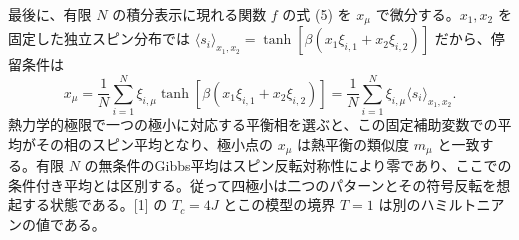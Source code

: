 \documentclass[11pt,a4paper]{article}
\begin{document}
最後に、有限 $N$ の積分表示に現れる関数 $f$ の式 (5) を $x_\mu$ で微分する。$x_1,x_2$ を固定した独立スピン分布では $\langle s_i\rangle_{x_1,x_2}=\tanh[\beta(x_1\xi_{i,1}+x_2\xi_{i,2})]$ だから、停留条件は
\begin{equation}
x_\mu=\frac1N\sum_{i=1}^N\xi_{i,\mu}
\tanh[\beta(x_1\xi_{i,1}+x_2\xi_{i,2})]
=\frac1N\sum_{i=1}^N\xi_{i,\mu}\langle s_i\rangle_{x_1,x_2}.
\end{equation}
熱力学的極限で一つの極小に対応する平衡相を選ぶと、この固定補助変数での平均がその相のスピン平均となり、極小点の $x_\mu$ は熱平衡の類似度 $m_\mu$ と一致する。有限 $N$ の無条件のGibbs平均はスピン反転対称性により零であり、ここでの条件付き平均とは区別する。従って四極小は二つのパターンとその符号反転を想起する状態である。[1] の $T_c=4J$ とこの模型の境界 $T=1$ は別のハミルトニアンの値である。
\end{document}
